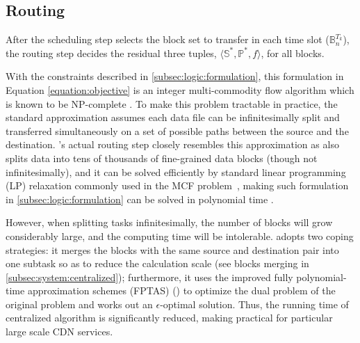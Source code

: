 \subsection{Routing}
\label{subsec:logic:routing}

After the scheduling step selects the block set to transfer in each time slot ($\mathbb{B}^{T_k}_n$), the routing step decides the residual three tuples, $\langle \mathbb{S}^*, \mathbb{P}^*, f \rangle$, for all blocks.

With the constraints described in \Section\ref{subsec:logic:formulation}, this formulation in Equation \ref{equation:objective} is an integer multi-commodity flow algorithm which is known to be NP-complete \cite{garg1997primal}.
To make this problem tractable in practice,
the standard approximation assumes each data file can be infinitesimally split and transferred simultaneously on a set of possible paths between the source and the destination.
\name's actual routing step closely resembles this approximation as \name also splits data into tens of thousands of fine-grained data blocks (though not infinitesimally), and it can be solved efficiently by standard linear programming (LP) relaxation commonly used in the MCF problem~\cite{garg2007faster},
making such formulation in \Section\ref{subsec:logic:formulation} can be solved in polynomial time \cite{reed2012traffic}.

However, when splitting tasks infinitesimally, the number of blocks will grow considerably large, and the computing time will be intolerable. \name adopts two coping strategies: it merges the blocks with the same source and destination pair into one subtask so as to reduce the calculation scale (see blocks merging in \Section\ref{subsec:system:centralized}); furthermore, it uses the improved fully polynomial-time approximation schemes (FPTAS) (\cite{fleischer2000approximating}) to optimize the dual problem of the original problem and works out an $\epsilon$-optimal solution. Thus, the running time of centralized algorithm is significantly reduced, making \name practical for particular large scale CDN services.
